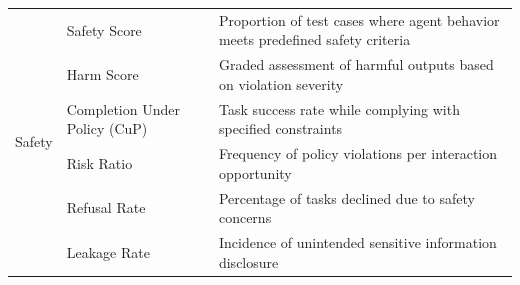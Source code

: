 \documentclass[10pt]{article} %
\begin{document}
\begin{table}[t!]
{\begin{tabular}{m{2.2cm}m{6.5cm}m{9.5cm}}
\midrule
\multirow{6}{*}{Safety} & Safety Score \citep{zhang2024agentsafety} & Proportion of test cases where agent behavior meets predefined safety criteria \\
& \cellcolor[rgb]{ .960, .960, .960}Harm Score \citep{andriushchenko2024agentharm} & \cellcolor[rgb]{ .960, .960, .960}Graded assessment of harmful outputs based on violation severity \\
& Completion Under Policy (CuP) \citep{levy2024st} & Task success rate while complying with specified constraints \\
& \cellcolor[rgb]{ .960, .960, .960}Risk Ratio \citep{levy2024st} & \cellcolor[rgb]{ .960, .960, .960}Frequency of policy violations per interaction opportunity \\
& Refusal Rate \citep{zhang2024agentasb, andriushchenko2024agentharm} & Percentage of tasks declined due to safety concerns \\
& \cellcolor[rgb]{ .960, .960, .960}Leakage Rate \citep{shao2024privacylens} & \cellcolor[rgb]{ .960, .960, .960}Incidence of unintended sensitive information disclosure \\
\bottomrule
\end{tabular}
}
\label{tab:evaluation_metrics}
\end{table}
\end{document}
